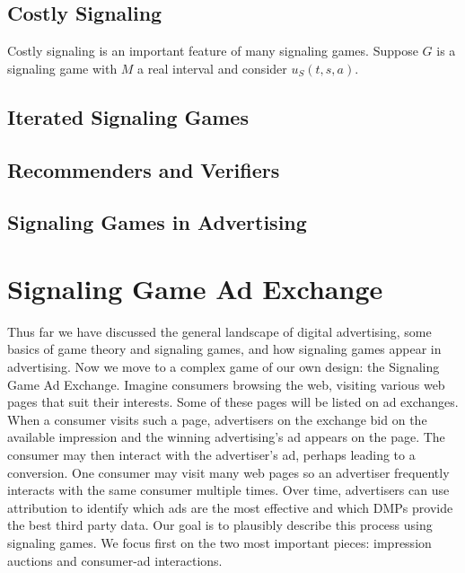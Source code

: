 \documentclass{article}
\begin{document}
\subsection{Costly Signaling}

Costly signaling is an important feature of many signaling games. Suppose $G$ is a signaling game with $M$ a real interval and consider $u_{S}(t,s,a)$.

\subsection{Iterated Signaling Games}

\subsection{Recommenders and Verifiers}

\subsection{Signaling Games in Advertising}

\newpage

\section{Signaling Game Ad Exchange}

Thus far we have discussed the general landscape of digital advertising, some basics of game theory and signaling games, and how signaling games appear in advertising. Now we move to a complex game of our own design: the Signaling Game Ad Exchange. Imagine consumers browsing the web, visiting various web pages that suit their interests. Some of these pages will be listed on ad exchanges. When a consumer visits such a page, advertisers on the exchange bid on the available impression and the winning advertising's ad appears on the page. The consumer may then interact with the advertiser's ad, perhaps leading to a conversion. One consumer may visit many web pages so an advertiser frequently interacts with the same consumer multiple times. Over time, advertisers can use attribution to identify which ads are the most effective and which DMPs provide the best third party data. Our goal is to plausibly describe this process using signaling games. We focus first on the two most important pieces: impression auctions and consumer-ad interactions.
\end{document}
